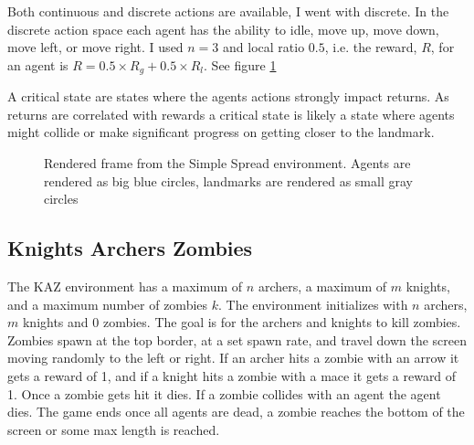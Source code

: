 \documentclass[UKenglish]{uiomasterthesis}
\begin{document}
Both continuous and discrete actions are available, I went with discrete. In the discrete action space each agent has the ability to idle, move up, move down, move left, or move right. I used $n=3$ and local ratio $0.5$, i.e. the reward, $R$, for an agent is $R = 0.5\times R_g + 0.5\times R_l$. See figure \ref{fig:simple_spread_env}

A critical state are states where the agents actions strongly impact returns. As returns are correlated with rewards a critical state is likely a state where agents might collide or make significant progress on getting closer to the landmark.

\begin{figure}[!ht]
    \centering
    \caption{Rendered frame from the Simple Spread environment. Agents are rendered as big blue circles, landmarks are rendered as small gray circles}
    \label{fig:simple_spread_env}
\end{figure}

\subsection{Knights Archers Zombies}
\label{sec:kaz_env}
The KAZ environment has a maximum of $n$ archers, a maximum of $m$ knights, and a maximum number of zombies $k$. The environment initializes with $n$ archers, $m$ knights and 0 zombies. The goal is for the archers and knights to kill zombies. Zombies spawn at the top border, at a set spawn rate, and travel down the screen moving randomly to the left or right. If an archer hits a zombie with an arrow it gets a reward of 1, and if a knight hits a zombie with a mace it gets a reward of 1. Once a zombie gets hit it dies. If a zombie collides with an agent the agent dies. The game ends once all agents are dead, a zombie reaches the bottom of the screen or some max length is reached.
\end{document}
